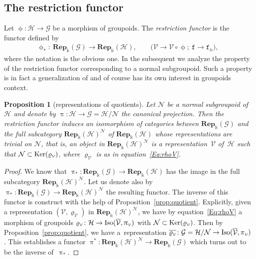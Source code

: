 \documentclass[pdftex]{sigma}
\numberwithin{equation}{section}
\newtheorem{Proposition}[Theorem]{Proposition}
 { \theoremstyle{definition}
\newtheorem{Definition}[Theorem]{Definition}
\newtheorem{Remark}[Theorem]{Remark}
\newtheorem{Example}[Theorem]{Example}
 }
\newcommand{\bara}[1]{\overline{#1}}
\newcommand{\Rep}[1]{\mathbf{Rep}_{\Sscript{\Bbbk}}(#1)}
\newcommand{\tF}{\texttt{f}}
\newcommand{\phil}{\upphi_{\Sscript{*}}}
\newcommand{\Ker}[1]{{\rm Ker}(#1)}
\newcommand{\cG}{{\mathcal G}}
\newcommand{\cH}{{\mathcal H}}
\newcommand{\cN}{{\mathcal N}}
\newcommand{\cV}{{\mathcal V}}
\newcommand{\Sscript}[1]{\scriptscriptstyle{#1}}
\begin{document}
\subsection{The restriction functor}\label{ssec:Res}
Let $\upphi\colon \cH \to \cG$ be a morphism of groupoids. The \emph{restriction functor} is the functor defined by
\begin{gather}\label{Eq:restriction}
\phil\colon \ \Rep{\cG} \longrightarrow \Rep{\cH}, \qquad \big( \cV\longrightarrow \cV \circ \upphi;\ \tF \longrightarrow\tF_{\Sscript{\upphi}} \big),
\end{gather}
where the notation is the obvious one. In the subsequent we analyze the property of the restriction functor corresponding to a normal subgroupoid. Such a property is in fact a generalization of \cite[Proposition~2.3.2]{Kowalski:2014} and of course has its own interest in groupoids context.

\begin{Proposition}[representations of quotients]\label{prop:Res} Let $\cN$ be a normal subgroupoid of $\cH$ and denote by $\uppi\colon \cH \to \cG=\cH/\cN$ the canonical projection. Then the restriction functor induces an isomorphism of categories between $\Rep{\cG}$ and the full subcategory $\Rep{\cH}^{\Sscript{\cN}}$ of $\Rep{\cH}$ whose representations are trivial on $\cN$, that is, an object in $\Rep{\cH}^{\Sscript{\cN}}$ is a representation~$\cV$ of~$\cH$ such that $\cN \subset \Ker{\varrho_{\Sscript{\cV}}}$, where $\varrho_{\Sscript{\cV}}$ is as in equation~\eqref{Eq:rhoV}.
\end{Proposition}
\begin{proof}We know that $\uppi_{*}\colon \Rep{\cG} \!\to\! \Rep{\cH}$ has the image in the full subcategory $\Rep{\cH}^{\Sscript{\cN}}\!$. Let us denote also by $\uppi_{*}\colon \Rep{\cG} \to \Rep{\cH}^{\Sscript{\cN}}$ the resulting functor. The inverse of this functor is construct with the help of Proposition~\ref{prop:quotient}. Explicitly, given a representation $(\cV, \varrho_{\Sscript{\cV}})$ in $\Rep{\cH}^{\Sscript{\cN}}$, we have by equation~\eqref{Eq:rhoV} a morphism of groupoids $\varrho_{\Sscript{\cV}}\colon \cH \to {\rm Iso}(\bara{\cV}, \uppi_{\Sscript{\cV}})$ with $\cN \subset \Ker{\varrho_{\Sscript{\cV}}}$. Then by Proposition~\ref{prop:quotient}, we have a~representation $\bara{\varrho_{\Sscript{\cV}}}\colon \cG=\cH/\cN \to {\rm Iso}(\bara{\cV}, \pi_{\Sscript{\cV}})$. This establishes a functor $\uppi^{*}\colon \Rep{\cH}^{\Sscript{\cN}} \to
\Rep{\cG}$ which turns out to be the inverse of~$\uppi_{*}$.
\end{proof}
\end{document}
